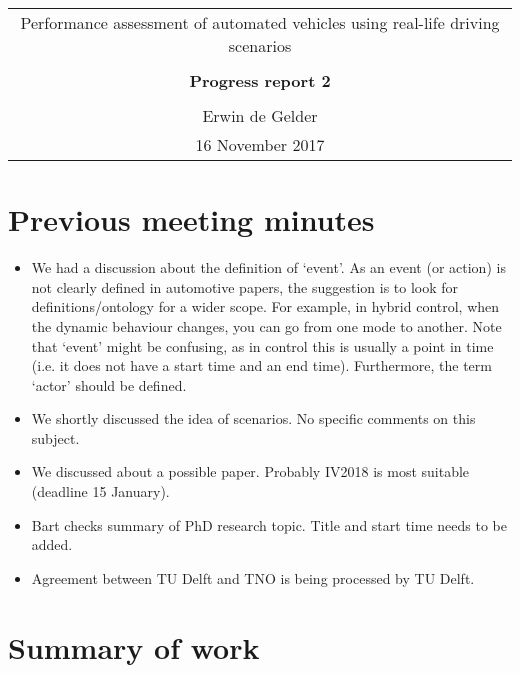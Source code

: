 \documentclass[10pt,final,a4paper,oneside,onecolumn]{article}
\newcommand{\progressreportnumber}{2}
\renewcommand{\author}{Erwin de Gelder}
\renewcommand{\date}{16 November 2017}
\renewcommand{\title}{Performance assessment of automated vehicles using real-life driving scenarios}
\begin{document}
	
\begin{center}
	\begin{tabular}{c}
		\title \\ \\
		\textbf{\huge Progress report \progressreportnumber} \\ \\
		\author \\ 
		\date
	\end{tabular}
\end{center}

\section{Previous meeting minutes}

\begin{itemize}
	\item We had a discussion about the definition of `event'. As an event (or action) is not clearly defined in automotive papers, the suggestion is to look for definitions/ontology for a wider scope. For example, in hybrid control, when the dynamic behaviour changes, you can go from one mode to another. Note that `event' might be confusing, as in control this is usually a point in time (i.e. it does not have a start time and an end time). Furthermore, the term `actor' should be defined.
	\item We shortly discussed the idea of scenarios. No specific comments on this subject.
	\item We discussed about a possible paper. Probably IV2018 is most suitable (deadline 15 January).
	\item Bart checks summary of PhD research topic. Title and start time needs to be added.
	\item Agreement between TU Delft and TNO is being processed by TU Delft. 
\end{itemize}

\section{Summary of work}
\end{document}
